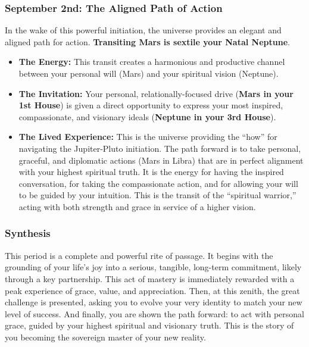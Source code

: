 \documentclass{article}
\begin{document}
\subsubsection*{September 2nd: The Aligned Path of Action}\label{september-2nd-the-aligned-path-of-action}

In the wake of this powerful initiation, the universe provides an elegant and aligned path for action. \textbf{Transiting Mars is sextile your Natal Neptune}.

\begin{itemize}
\item
  \textbf{The Energy:} This transit creates a harmonious and productive channel between your personal will (Mars) and your spiritual vision (Neptune).
\item
  \textbf{The Invitation:} Your personal, relationally-focused drive (\textbf{Mars in your 1st House}) is given a direct opportunity to express your most inspired, compassionate, and visionary ideals (\textbf{Neptune in your 3rd House}).
\item
  \textbf{The Lived Experience:} This is the universe providing the ``how'' for navigating the Jupiter-Pluto initiation. The path forward is to take personal, graceful, and diplomatic actions (Mars in Libra) that are in perfect alignment with your highest spiritual truth. It is the energy for having the inspired conversation, for taking the compassionate action, and for allowing your will to be guided by your intuition. This is the transit of the ``spiritual warrior,'' acting with both strength and grace in service of a higher vision.
\end{itemize}

\subsubsection*{Synthesis}\label{synthesis}

This period is a complete and powerful rite of passage. It begins with the grounding of your life's joy into a serious, tangible, long-term commitment, likely through a key partnership. This act of mastery is immediately rewarded with a peak experience of grace, value, and appreciation. Then, at this zenith, the great challenge is presented, asking you to evolve your very identity to match your new level of success. And finally, you are shown the path forward: to act with personal grace, guided by your highest spiritual and visionary truth. This is the story of you becoming the sovereign master of your new reality.
\end{document}
